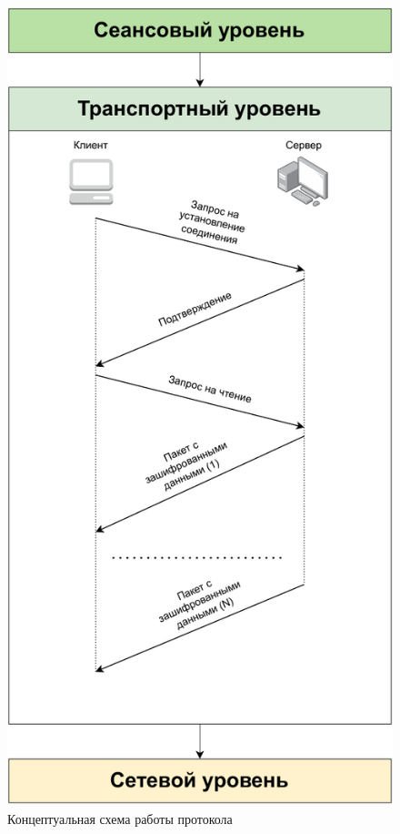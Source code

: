 \begin{figure}[H]
	\centering
	\includegraphics[scale=0.75]{img/proto_scheme.pdf}
	\caption{Концептуальная схема работы протокола}
	\label{fig:proto_scheme}
\end{figure}

